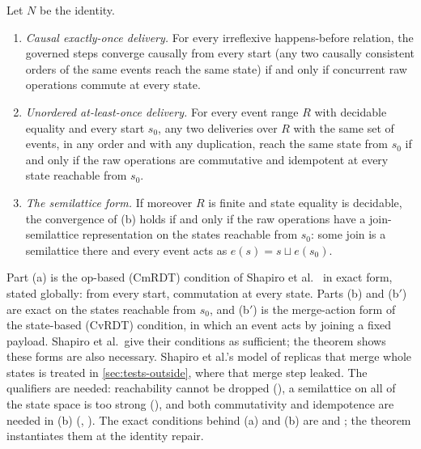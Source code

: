 \begin{theorem}\label{thm:boundary}
Let $N$ be the identity.
\begin{enumerate}[label=(\alph*)]
  \item \emph{Causal exactly-once delivery.} For every irreflexive happens-before relation, the
    governed steps converge causally from every start (any two causally consistent orders of the
    same events reach the same state) if and only if concurrent raw operations commute at every
    state.
  \item \emph{Unordered at-least-once delivery.} For every event range $R$ with decidable equality
    and every start $s_0$, any two deliveries over $R$ with the same set of events, in any order and
    with any duplication, reach the same state from $s_0$ if and only if the raw operations are
    commutative and idempotent at every state reachable from $s_0$.
  \item[(b$'$)] \emph{The semilattice form.} If moreover $R$ is finite and state equality is
    decidable, the convergence of (b) holds if and only if the raw operations have a
    join-semilattice representation on the states reachable from $s_0$: some join is a semilattice
    there and every event acts as $e(s) = s \sqcup e(s_0)$.
\end{enumerate}
\end{theorem}

Part (a) is the op-based (CmRDT) condition of Shapiro et al.~\cite{shapiro2011} in exact form, stated
globally: from every start, commutation at every state. Parts (b) and (b$'$) are exact on the states
reachable from $s_0$, and (b$'$) is the merge-action form of the state-based (CvRDT) condition, in which
an event acts by joining a fixed payload. Shapiro et al.\ give their conditions as sufficient; the
theorem shows these forms are also necessary. Shapiro et al.'s model of replicas that merge whole
states is treated in \cref{sec:tests-outside}, where that merge step leaked. The qualifiers are needed: reachability cannot be dropped (), a semilattice on
all of the state space is too strong (), and both commutativity and
idempotence are needed in (b) (, ). The exact conditions behind
(a) and (b) are  and ; the theorem instantiates
them at the identity repair.

